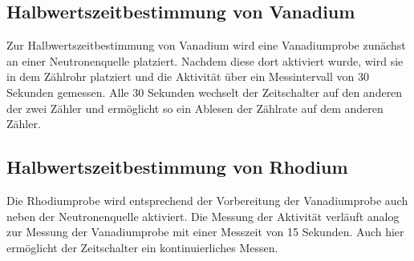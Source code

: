     \subsection{Halbwertszeitbestimmung von Vanadium}
        Zur Halbwertszeitbestimmung von Vanadium wird eine Vanadiumprobe zunächst an einer Neutronenquelle platziert. Nachdem diese dort aktiviert wurde, wird sie in dem Zählrohr platziert und 
        die Aktivität über ein Messintervall von 30 Sekunden gemessen. Alle 30 Sekunden wechselt der Zeitschalter auf den anderen der zwei Zähler und ermöglicht so ein Ablesen der Zählrate auf
        dem anderen Zähler.

    \subsection{Halbwertszeitbestimmung von Rhodium}
        Die Rhodiumprobe wird entsprechend der Vorbereitung der Vanadiumprobe auch neben der Neutronenquelle aktiviert. Die Messung der Aktivität verläuft analog zur Messung der Vanadiumprobe
        mit einer Messzeit von 15 Sekunden. Auch hier ermöglicht der Zeitschalter ein kontinuierliches Messen.
        
